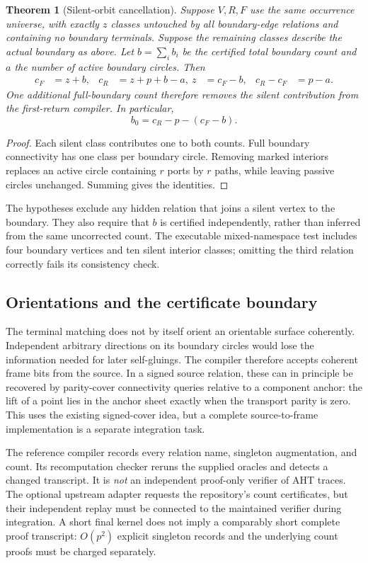 \documentclass[11pt]{article}
\newtheorem{theorem}{Theorem}[section]
\theoremstyle{definition}
\theoremstyle{remark}\newtheorem{remark}[theorem]{Remark}
\begin{document}
\begin{theorem}[Silent-orbit cancellation]\label{thm:silent}
Suppose $V,R,F$ use the same occurrence universe, with exactly $z$ classes untouched by all boundary-edge relations and containing no boundary terminals. Suppose the remaining classes describe the actual boundary as above. Let $b=\sum_i b_i$ be the certified total boundary count and $a$ the number of active boundary circles. Then
\begin{align}
 c_F&=z+b, & c_R&=z+p+b-a,\
 z&=c_F-b, & c_R-c_F&=p-a.\label{eq:cancel}
\end{align}
One additional full-boundary count therefore removes the silent contribution from the first-return compiler. In particular,
\[
                 b_0=c_R-p-(c_F-b).
\]
\end{theorem}
\begin{proof}
Each silent class contributes one to both counts. Full boundary connectivity has one class per boundary circle. Removing marked interiors replaces an active circle containing $r$ ports by $r$ paths, while leaving passive circles unchanged. Summing gives the identities.
\end{proof}

The hypotheses exclude any hidden relation that joins a silent vertex to the boundary. They also require that $b$ is certified independently, rather than inferred from the same uncorrected count. The executable mixed-namespace test includes four boundary vertices and ten silent interior classes; omitting the third relation correctly fails its consistency check.

\subsection{Orientations and the certificate boundary}
The terminal matching does not by itself orient an orientable surface coherently. Independent arbitrary directions on its boundary circles would lose the information needed for later self-gluings. The compiler therefore accepts coherent frame bits from the source. In a signed source relation, these can in principle be recovered by parity-cover connectivity queries relative to a component anchor: the lift of a point lies in the anchor sheet exactly when the transport parity is zero. This uses the existing signed-cover idea, but a complete source-to-frame implementation is a separate integration task.

The reference compiler records every relation name, singleton augmentation, and count. Its recomputation checker reruns the supplied oracles and detects a changed transcript. It is \emph{not} an independent proof-only verifier of AHT traces. The optional upstream adapter requests the repository's count certificates, but their independent replay must be connected to the maintained verifier during integration. A short final kernel does not imply a comparably short complete proof transcript: $O(p^2)$ explicit singleton records and the underlying count proofs must be charged separately.
\end{document}
